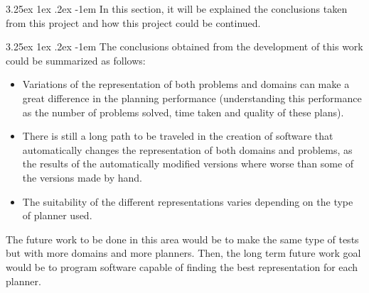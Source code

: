 \documentclass{article}
\makeatletter
\newcounter{subsubsubsection}
\renewcommand\paragraph{\@startsection{paragraph}{5}{\z@}%
      {3.25ex \@plus1ex \@minus.2ex}%
      {-1em}%
      {\normalfont\normalsize\bfseries}}
\makeatother
\begin{document}
    \paragraph{}
    In this section, it will be explained the conclusions taken from this project and how this project could be continued.
    
    \setcounter{subsubsubsection}{0}
    \paragraph{}
    The conclusions obtained from the development of this work could be summarized as follows:
    \begin{itemize}
        \item Variations of the representation of both problems and domains can make a great difference in the planning performance (understanding this performance as the number of problems solved, time taken and quality of these plans).
        \item There is still a long path to be traveled in the creation of software that automatically changes the representation of both domains and problems, as the results of the automatically modified versions where worse than some of the versions made by hand.
        \item The suitability of the different representations varies depending on the type of planner used.
    \end{itemize}
    
    The future work to be done in this area would be to make the same type of tests but with more domains and more planners. Then, the long term future work goal would be to program software capable of finding the best representation for each planner.
    
    \pagebreak
    
    
    
    
    
\end{document}
